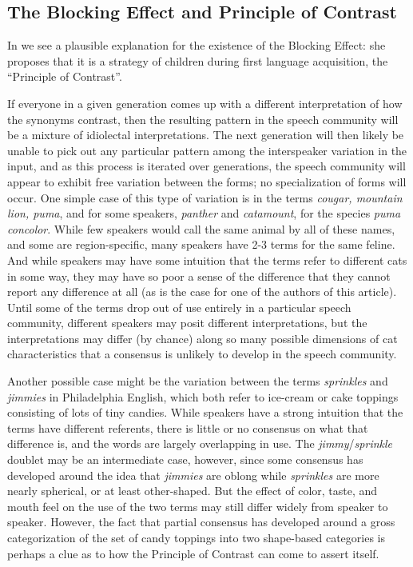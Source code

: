\subsection{The Blocking Effect and Principle of Contrast}

In \citet{clark1987} we see a plausible explanation for the existence of the Blocking Effect: she proposes that it is a strategy of children during first language acquisition, the ``Principle of Contrast''. %

If everyone in a given generation comes up with a different interpretation of how the synonyms contrast, then the resulting pattern in the speech community will be a mixture of idiolectal interpretations. The next generation will then likely be unable to pick out any particular pattern among the interspeaker variation in the input, and as this process is iterated over generations, the speech community will appear to exhibit free variation between the forms; no specialization of forms will occur. One simple case of this type of variation is in the terms \textsl{cougar, mountain lion, puma}, and for some speakers, \textsl{panther} and \textsl{catamount}, for the species \textsl{puma concolor}. While few speakers would call the same animal by all of these names, and some are region-specific, many speakers have 2-3 terms for the same feline. And while speakers may have some intuition that the terms refer to different cats in some way, they may have so poor a sense of the difference that they cannot report any difference at all (as is the case for one of the authors of this article). Until some of the terms drop out of use entirely in a particular speech community, different speakers may posit different interpretations, but the interpretations may differ (by chance) along so many possible dimensions of cat characteristics that a consensus is unlikely to develop in the speech community. 

Another possible case might be the variation between the terms \textsl{sprinkles} and \textsl{jimmies} in Philadelphia English, which both refer to ice-cream or cake toppings consisting of lots of tiny candies. While speakers have a strong intuition that the terms have different referents, there is little or no consensus on what that difference is, and the words are largely overlapping in use. The \textsl{jimmy}/\textsl{sprinkle} doublet may be an intermediate case, however, since some consensus has developed around the idea that \textsl{jimmies} are oblong while \textsl{sprinkles} are more nearly spherical, or at least other-shaped. But the effect of color, taste, and mouth feel on the use of the two terms may still differ widely from speaker to speaker. However, the fact that partial consensus has developed around a gross categorization of the set of candy toppings into two shape-based categories is perhaps a clue as to how the Principle of Contrast can come to assert itself.

